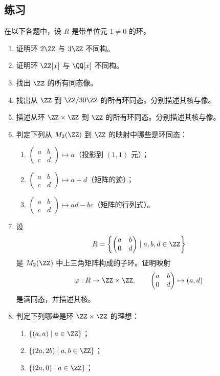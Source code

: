 \subsection*{练习}
在以下各题中，设 $R$ 是带单位元 $1\neq0$ 的环。
\begin{enumerate}[label=\arabic*.]
	\item 证明环 $2\ZZ$ 与 $3\ZZ$ 不同构。
	\item 证明环 $\ZZ[x]$ 与 $\QQ[x]$ 不同构。
	\item 找出 $\ZZ$ 的所有同态像。
	\item 找出从 $\ZZ$ 到 $\ZZ/30\ZZ$ 的所有环同态。分别描述其核与像。
	\item 描述从环 $\ZZ\times\ZZ$ 到 $\ZZ$ 的所有环同态。分别描述其核与像。
	\item 判定下列从 $M_2(\ZZ)$ 到 $\ZZ$ 的映射中哪些是环同态：
	\begin{enumerate}[label=(\alph*)]
		\item $\begin{pmatrix}a&b\\ c&d\end{pmatrix}\mapsto a$（投影到 $(1,1)$ 元）；
		\item $\begin{pmatrix}a&b\\ c&d\end{pmatrix}\mapsto a+d$（矩阵的迹）；
		\item $\begin{pmatrix}a&b\\ c&d\end{pmatrix}\mapsto ad-bc$（矩阵的行列式）。
	\end{enumerate}
	\item 设
	\[
	R=\left\{\begin{pmatrix}a&b\\0&d\end{pmatrix}\mid a,b,d\in\ZZ\right\}
	\]
	是 $M_2(\ZZ)$ 中上三角矩阵构成的子环。证明映射
	\[
	\varphi:R\to\ZZ\times\ZZ,
	\qquad
	\begin{pmatrix}a&b\\0&d\end{pmatrix}\mapsto(a,d)
	\]
	是满同态，并描述其核。
	\item 判定下列哪些是环 $\ZZ\times\ZZ$ 的理想：
	\begin{enumerate}[label=(\alph*)]
		\item $\{(a,a)\mid a\in\ZZ\}$；
		\item $\{(2a,2b)\mid a,b\in\ZZ\}$；
		\item $\{(2a,0)\mid a\in\ZZ\}$；

\end{enumerate}
\end{enumerate}
